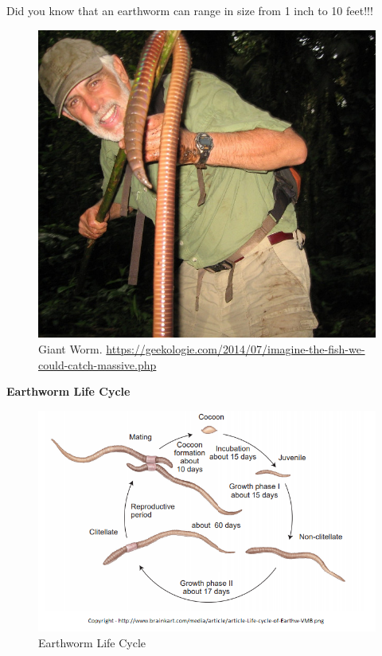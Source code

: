 \documentclass[
]{book}
\begin{document}
Did you know that an earthworm can range in size from 1 inch to 10 feet!!!

\begin{figure}
\centering
\includegraphics{images/Lab6_giant_worm.png}
\caption{Giant Worm. \url{https://geekologie.com/2014/07/imagine-the-fish-we-could-catch-massive.php}}
\end{figure}

\textbf{Earthworm Life Cycle}

\begin{figure}
\centering
\includegraphics{images/Lab6_earthworm_life_cycle.png}
\caption{Earthworm Life Cycle}
\end{figure}
\end{document}
